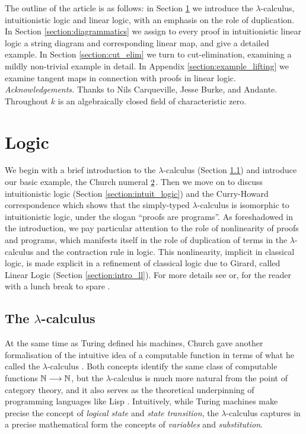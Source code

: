 \documentclass[english,letter paper,12pt,reqno]{article}
\theoremstyle{example}
\numberwithin{equation}{section}
\begin{document}
The outline of the article is as follows: in Section \ref{section:logic} we introduce the $\lambda$-calculus, intuitionistic logic and linear logic, with an emphasis on the role of duplication. In Section \ref{section:diagrammatics} we assign to every proof in intuitionistic linear logic a string diagram and corresponding linear map, and give a detailed example. In Section \ref{section:cut_elim} we turn to cut-elimination, examining a mildly non-trivial example in detail. In Appendix \ref{section:example_lifting} we examine tangent maps in connection with proofs in linear logic. 
\\

\emph{Acknowledgements.} Thanks to Nils Carqueville, Jesse Burke, and Andante.
\\

Throughout $k$ is an algebraically closed field of characteristic zero.

\section{Logic}\label{section:logic}

We begin with a brief introduction to the $\lambda$-calculus (Section \ref{section:lambda_calc}) and introduce our basic example, the Church numeral $\underline{2}$. Then we move on to discuss intuitionistic logic (Section \ref{section:intuit_logic}) and the Curry-Howard correspondence which shows that the simply-typed $\lambda$-calculus is isomorphic to intuitionistic logic, under the slogan ``proofs are programs''. As foreshadowed in the introduction, we pay particular attention to the role of nonlinearity of proofs and programs, which manifests itself in the role of duplication of terms in the $\lambda$-calculus and the contraction rule in logic. This nonlinearity, implicit in classical logic, is made explicit in a refinement of classical logic due to Girard, called Linear Logic (Section \ref{section:intro_ll}). For more details see \cite{girard_prooftypes,mellies} or, for the reader with a lunch break to spare \cite{scott_talk}.

\subsection{The $\lambda$-calculus}\label{section:lambda_calc}

At the same time as Turing defined his machines, Church gave another formalisation of the intuitive idea of a computable function in terms of what he called the $\lambda$-calculus \cite{church,selinger}. Both concepts identify the same class of computable functions $\mathbb{N} \longrightarrow \mathbb{N}$, but the $\lambda$-calculus is much more natural from the point of category theory, and it also serves as the theoretical underpinning of programming languages like Lisp \cite{mccarthy}. Intuitively, while Turing machines make precise the concept of \emph{logical state} and \emph{state transition}, the $\lambda$-calculus captures in a precise mathematical form the concepts of \emph{variables} and \emph{substitution}. 
\end{document}

